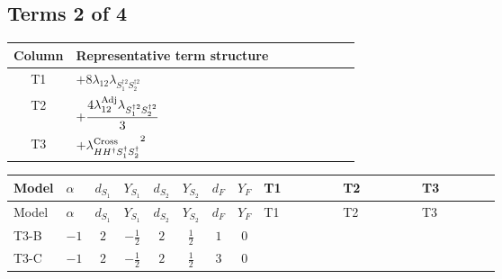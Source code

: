 \documentclass[8pt]{article}
\begin{document}
\begin{landscape}
\subsection*{Terms 2 of 4}
\begin{center}
\begin{tabular}{@{}c >{\raggedright\arraybackslash}p{0.82\linewidth}@{}}
\toprule
Column & Representative term structure \\
\midrule
T1 & \(\displaystyle +8 {\lambda_{12}} {\lambda_{S_1^{\dagger 2}S_2^{\dagger 2}}}\) \\
\midrule
T2 & \(\displaystyle +\frac{4 {\lambda_{12}^{\rm Adj}} {\lambda_{S_1^{\dagger 2}S_2^{\dagger 2}}}}{3}\) \\
\midrule
T3 & \(\displaystyle +{\lambda_{H H^\dagger S_1^\dagger S_2^\dagger}^{\rm Cross}}^2\) \\
\midrule
\bottomrule
\end{tabular}
\end{center}
\smallskip
\tiny
\begin{longtable}{@{}llcccccc >{\raggedright\arraybackslash}p{0.21\linewidth} >{\raggedright\arraybackslash}p{0.21\linewidth} >{\raggedright\arraybackslash}p{0.21\linewidth}@{}}
\toprule
Model & $\alpha$ & $d_{S_1}$ & $Y_{S_1}$ & $d_{S_2}$ & $Y_{S_2}$ & $d_F$ & $Y_F$ & T1 & T2 & T3 \\
\midrule
\endfirsthead
\toprule
Model & $\alpha$ & $d_{S_1}$ & $Y_{S_1}$ & $d_{S_2}$ & $Y_{S_2}$ & $d_F$ & $Y_F$ & T1 & T2 & T3 \\
\midrule
\endhead
T3-B & $-1$ & $2$ & $-\frac{1}{2}$ & $2$ & $\frac{1}{2}$ & $1$ & $0$ & \scriptsize\adjustbox{max width=\linewidth}{$\begin{gathered} +8 {\lambda_{12}} {\lambda_{S_1^{\dagger 2}S_2^{\dagger 2}}}\end{gathered}$} & \scriptsize\adjustbox{max width=\linewidth}{$\begin{gathered} +\frac{4 {\lambda_{12}^{\rm Adj}} {\lambda_{S_1^{\dagger 2}S_2^{\dagger 2}}}}{3}\end{gathered}$} & \scriptsize\adjustbox{max width=\linewidth}{$\begin{gathered} +{\lambda_{H H^\dagger S_1^\dagger S_2^\dagger}^{\rm Cross}}^2\end{gathered}$} \\
\midrule
T3-C & $-1$ & $2$ & $-\frac{1}{2}$ & $2$ & $\frac{1}{2}$ & $3$ & $0$ & \scriptsize\adjustbox{max width=\linewidth}{$\begin{gathered} +8 {\lambda_{12}} {\lambda_{S_1^{\dagger 2}S_2^{\dagger 2}}}\end{gathered}$} & \scriptsize\adjustbox{max width=\linewidth}{$\begin{gathered} +\frac{4 {\lambda_{12}^{\rm Adj}} {\lambda_{S_1^{\dagger 2}S_2^{\dagger 2}}}}{3}\end{gathered}$} & \scriptsize\adjustbox{max width=\linewidth}{$\begin{gathered} +{\lambda_{H H^\dagger S_1^\dagger S_2^\dagger}^{\rm Cross}}^2\end{gathered}$} \\

\end{longtable}
\end{landscape}
\end{document}
